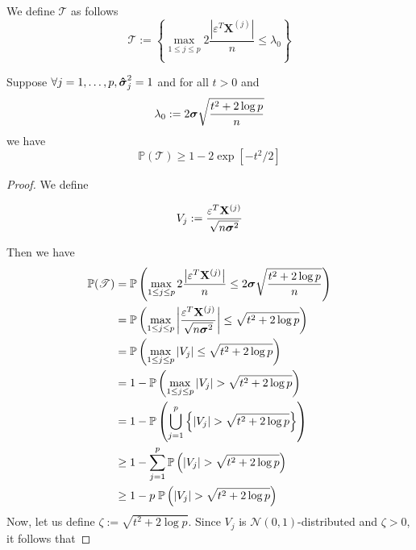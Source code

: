 We define \(\mathscr{T}\) as follows
$$\mathscr{T} := \left\{ \max _{1 \leq j \leq p} 2 \frac{\left| \varepsilon^{T} \mathbf{X}^{(j)}\right|}{n} \leq \lambda_{0}\right\}$$

\begin{lemma}[Lemma 6.2.]
    Suppose \(\forall j = 1, \ldots, p, \boldsymbol{\hat{\sigma}}_j^2 = 1 \) and for all $t > 0$ and
    $$\lambda_{0}:=2 \boldsymbol{\sigma} \sqrt{\frac{t^{2}+2 \log p}{n}}$$
    we have
    $$\mathbb{P}(\mathscr{T}) \geq 1-2 \exp \left[-t^{2} / 2\right]$$
\end{lemma}
\begin{proof}
    We define

    $$
        V_{j} := \frac{\varepsilon^{T} \mathbf{X}^{(j)}}{\sqrt{n \boldsymbol{\sigma}^{2}}}
    $$

    Then we have
    \begin{align}
        \nonumber
        \mathbb{P}(\mathscr{T})
         & = \mathbb{P} \left( \max _{1 \leq j \leq p} 2 \frac{\left| \varepsilon^{T} \mathbf{X}^{(j)}\right|}{n} \leq 2 \boldsymbol{\sigma} \sqrt{\frac{t^{2}+2 \log p}{n}}  \right) \\
        \nonumber
         & =
        \mathbb{P} \left( \max _{1 \leq j \leq p} \left| \frac{\varepsilon^{T} \mathbf{X}^{(j)}}{\sqrt{n \boldsymbol{\sigma}^{2}}} \right| \leq \sqrt{t^{2}+2 \log p}  \right)        \\
        \nonumber
         & =
        \mathbb{P} \left( \max _{1 \leq j \leq p} | V_{j} | \leq \sqrt{t^{2}+2 \log p}  \right)                                                                        \\
        \nonumber
         & = 1 - \mathbb{P} \left( \max _{1 \leq j \leq p} | V_{j} | > \sqrt{t^{2}+2 \log p}  \right)                                                                  \\
        \nonumber
         & = 1 - \mathbb{P} \left( \bigcup_{j = 1}^{p} \left\{ | V_{j} | > \sqrt{t^{2}+2 \log p}  \right\} \right)                                                     \\
        \nonumber
         & \geq 1 - \sum_{j = 1}^{p} \mathbb{P} \left( | V_{j} | > \sqrt{t^{2}+2 \log p}  \right)                                                                      \\
        \label{eqn: proof lemma 6.2.}
         & \geq 1 - p \; \mathbb{P} \left( | V_{j} | > \sqrt{t^{2}+2 \log p}  \right)
    \end{align}
    Now, let us define $\zeta := \sqrt{t^{2}+2 \log p}$. Since $V_j$ is $\mathscr{N} (0,1)$-distributed and $\zeta > 0$, it follows that


\end{proof}
